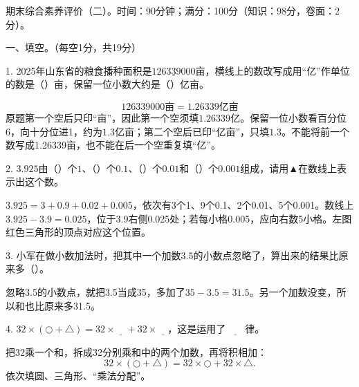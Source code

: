 期末综合素养评价（二）。时间：90分钟；满分：100分（知识：98分，卷面：2分）。\par 一、填空。（每空1分，共19分）\par 1. 2025年山东省的粮食播种面积是\(\underline{126339000}\)亩，横线上的数改写成用“亿”作单位的数是（\hspace{1.8em}）亩，保留一位小数大约是（\hspace{1.8em}）亿亩。\par
\begin{BookAnswer}
\[126339000\text{亩}=1.26339\text{亿亩}\]原题第一个空后只印“亩”，因此第一个空须填\(1.26339\text{亿}\)。保留一位小数看百分位6，向十分位进1，约为\(1.3\text{亿亩}\)；第二个空后已印“亿亩”，只填\(1.3\)。不能将前一个数写成1.26339亩，也不能在后一个空重复填“亿”。
\end{BookAnswer}

2. \(3.925\)由（\hspace{1.8em}）个\(1\)、（\hspace{1.8em}）个\(0.1\)、（\hspace{1.8em}）个\(0.01\)和（\hspace{1.8em}）个\(0.001\)组成，请用▲在数线上表示出这个数。\par
{}
\begin{BookAnswer}
\(3.925=3+0.9+0.02+0.005\)，依次有3个1、9个0.1、2个0.01、5个0.001。数线上\(3.925-3.9=0.025\)，位于3.9右侧0.025处；若每小格0.005，应向右数5小格。左图红色三角形的顶点对应这个位置。
\end{BookAnswer}

3. 小军在做小数加法时，把其中一个加数\(3.5\)的小数点忽略了，算出来的结果比原来多（\hspace{1.8em}）。\par
\begin{BookAnswer}
忽略3.5的小数点，就把3.5当成35，多加了\(35-3.5=31.5\)。另一个加数没变，所以和也比原来多31.5。
\end{BookAnswer}

4. \(32\times(\bigcirc+\triangle)=32\times\underline{\quad}+32\times\underline{\quad}\)，这是运用了\(\underline{\qquad}\)律。\par
\begin{BookAnswer}
把32乘一个和，拆成32分别乘和中的两个加数，再将积相加：\[32\times(\bigcirc+\triangle)=32\times\bigcirc+32\times\triangle.\]依次填圆、三角形、“乘法分配”。
\end{BookAnswer}

